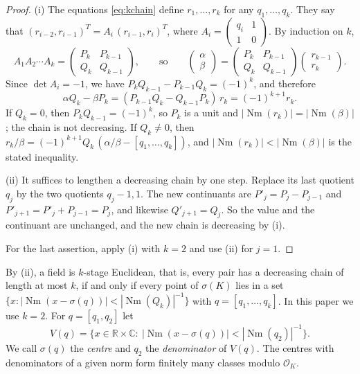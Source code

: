 \documentclass[11pt]{amsart}
\theoremstyle{definition}
\theoremstyle{remark}
\numberwithin{equation}{section}
\newcommand{\Q}{\mathbb{Q}}
\newcommand{\R}{\mathbb{R}}
\newcommand{\C}{\mathbb{C}}
\newcommand{\cO}{\mathcal{O}}
\newcommand{\Nm}{\operatorname{Nm}}
\begin{document}
\begin{proof}
(i) The equations \eqref{eq:kchain} define $r_1,\dots,r_k$ for any $q_1,\dots,q_k$. They say
that $(r_{i-2},r_{i-1})^T=A_i\,(r_{i-1},r_i)^T$, where
$A_i=\left(\begin{smallmatrix}q_i&1\\1&0\end{smallmatrix}\right)$. By induction on $k$,
\[
  A_1A_2\cdots A_k=\begin{pmatrix}P_k&P_{k-1}\\Q_k&Q_{k-1}\end{pmatrix},
  \qquad\text{so}\qquad
  \begin{pmatrix}\alpha\\\beta\end{pmatrix}=
  \begin{pmatrix}P_k&P_{k-1}\\Q_k&Q_{k-1}\end{pmatrix}
  \begin{pmatrix}r_{k-1}\\r_k\end{pmatrix}.
\]
Since $\det A_i=-1$, we have $P_kQ_{k-1}-P_{k-1}Q_k=(-1)^k$, and therefore
\[
  \alpha Q_k-\beta P_k=(P_{k-1}Q_k-Q_{k-1}P_k)\,r_k=(-1)^{k+1}r_k .
\]
If $Q_k=0$, then $P_kQ_{k-1}=(-1)^k$, so $P_k$ is a unit and $|\Nm(r_k)|=|\Nm(\beta)|$; the chain
is not decreasing. If $Q_k\ne0$, then
$r_k/\beta=(-1)^{k+1}Q_k\,(\alpha/\beta-[q_1,\dots,q_k])$, and $|\Nm(r_k)|<|\Nm(\beta)|$ is the
stated inequality.

(ii) It suffices to lengthen a decreasing chain by one step. Replace its last quotient $q_j$ by
the two quotients $q_j-1,1$. The new continuants are $P'_j=P_j-P_{j-1}$ and
$P'_{j+1}=P'_j+P_{j-1}=P_j$, and likewise $Q'_{j+1}=Q_j$. So the value and the continuant are
unchanged, and the new chain is decreasing by (i).

For the last assertion, apply (i) with $k=2$ and use (ii) for $j=1$.
\end{proof}

By (ii), a field is $k$-stage Euclidean, that is, every pair has a decreasing chain of length
at most $k$, if and only if every point of $\sigma(K)$ lies in a set
$\{x:|\Nm(x-\sigma(q))|<|\Nm(Q_k)|^{-1}\}$ with $q=[q_1,\dots,q_k]$. In this paper we use $k=2$.
For $q=[q_1,q_2]$ let
\[
  V(q)=\bigl\{x\in\R\times\C:\ |\Nm(x-\sigma(q))|<|\Nm(q_2)|^{-1}\bigr\}.
\]
We call $\sigma(q)$ the \emph{centre} and $q_2$ the \emph{denominator} of $V(q)$. The centres
with denominators of a given norm form finitely many classes modulo $\cO_K$.
\end{document}
